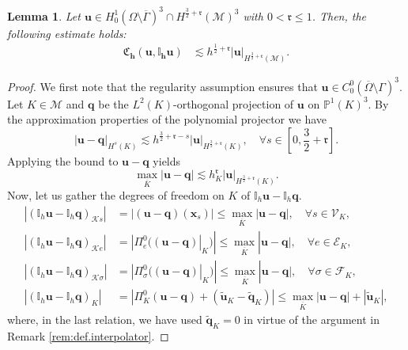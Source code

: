 \documentclass[a4paper,11pt]{article}
\newtheorem{lemma}[theorem]{Lemma}
\theoremstyle{definition}
\theoremstyle{remark}
\newcommand{\bvec}[1]{\boldsymbol{#1}}
\newcommand{\bo}[1]{\mathbf{#1}}
\newcommand{\bx}{\bvec{x}}
\newcommand{\bos}[1]{\boldsymbol{#1}}
\newcommand{\mI}[1]{\mathbb I_h\bo{#1}}
\def\P{\mathbb{P}}
\def\cE{\mathcal{E}}
\def\cF{\mathcal{F}}
\def\cK{\mathcal{K}}
\def\cM{\mathcal{M}}
\def\cV{\mathcal{V}}
\def\fr{\mathfrak{r}}
\def\fC{\mathfrak{C}}
\def\O{\Omega}
\begin{document}
\begin{lemma}\label{l4.4} Let $\bo{u}\in H^1_0(\O\setminus\overline{\Gamma})^3\cap H^{\frac{3}{2}+\fr}(\cM)^3$ with $0<\fr\leq 1$. Then, the following estimate holds:
\begin{align}
\bos{\fC_h(\bo{u},\mathbb I_h\bo{u})}&\lesssim h^{\frac{1}{2}+\fr}\lvert\bo{u}\rvert_{H^{\frac{3}{2}+\fr}(\cM)}.\label{eq:primal.est1}
\end{align}
\end{lemma}
\begin{proof} We first note that the regularity assumption ensures that $\bo{u}\in C^0_0(\overline{\O}\setminus\Gamma)^3$. Let $K\in\cM$ and $\bo{q}$ be the $L^2(K)$-orthogonal projection of $\bo{u}$ on $\P^1(K)^3$. By the approximation properties of the polynomial projector \cite[Theorem 1.45]{hho-book} we have
\begin{equation}\label{eq:primal.est2}
\lvert \bo{u}-\bo{q}\rvert_{H^s(K)}\lesssim h^{\frac{3}{2}+\fr-s}\lvert \bo{u}\rvert_{H^{\frac{3}{2}+\fr}(K)},\quad\forall s\in\left[0,\frac{3}{2}+\fr\right].
\end{equation}
Applying the bound \cite[Eq.(5.110)]{hho-book} to $\bo{u}-\bo{q}$ yields
\begin{equation}\label{eq:est.u.q}
\max_{\overline{K}}\lvert \bo{u-q}\rvert\lesssim h^{\fr}_K\lvert \bo{u}\rvert_{H^{\frac{3}{2}+\fr}(K)}.
\end{equation}
Now, let us gather the degrees of freedom on $K$ of $\mI{u}-\mI{q}$.
\begin{equation}\label{eq:primal.est3}
\begin{aligned}
|(\mI{u}-\mI{q})_{\cK s}| &= |(\bo{u-q})(\bx_s)| \leq \max_{\overline{K}} |\bo{u-q}|,  \quad\forall s \in \cV_K,\\
|(\mI{u}-\mI{q})_{\cK e}| &= |\Pi^0_e((\bo{u-q})|_K)| \leq \max_{\overline{K}} |\bo{u-q}|, \quad \forall e \in \cE_K,\\
|(\mI{u}-\mI{q})_{\cK \sigma}| &= |\Pi^0_\sigma((\bo{u-q})|_K)| \leq \max_{\overline{K}} |\bo{u-q}|, \quad\forall \sigma \in \cF_K,\\
|(\mI{u}-\mI{q})_{K}| &= |\Pi^0_K(\bo{u-q}) + (\widetilde{\bo{u}}_K-\widetilde{\bo{q}}_K)| 
\leq \max_{\overline{K}} |\bo{u-q}| + |\widetilde{\bo{u}}_K|,
\end{aligned}
\end{equation}
where, in the last relation, we have used $\widetilde{\bo{q}}_K=0$ in virtue of the argument in Remark \ref{rem:def.interpolator}.

\end{proof}
\end{document}
